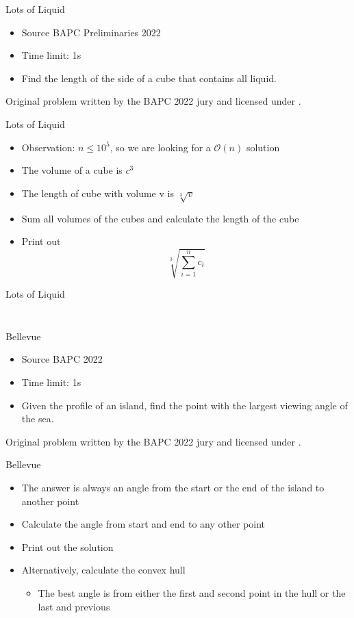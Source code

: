 \documentclass[11pt,pdf, aspectratio=169]{beamer}
\begin{document}
  \begin{frame}{Lots of Liquid}
    \begin{itemize}
      \item Source BAPC Preliminaries 2022
      \item Time limit: 1s
      \item Find the length of the side of a cube that contains all liquid.
    \end{itemize}
    Original problem written by the BAPC 2022 jury and licensed under \doclicenseLongNameRef.

    \doclicenseImage
  \end{frame}
  \begin{frame}{Lots of Liquid}
    \begin{itemize}
      \item Observation: $n \leq 10^5$, so we are looking for a $\mathcal{O}(n)$ solution
      \item The volume of a cube is $c^3$
      \item The length of cube with volume v is $\sqrt[3]{v}$
      \item Sum all volumes of the cubes and calculate the length of the cube
      \item Print out \[\sqrt[3]{\sum_{i=1}^nc_i}\]
    \end{itemize}
  \end{frame}
  \begin{frame}[containsverbatim]{Lots of Liquid}
    \inputminted{python}{code/session-1/python/dapc-l.py}
    \inputminted{kotlin}{code/session-1/kotlin/dapc-l.kt}
  \end{frame}
  \begin{frame}{Bellevue}
    \begin{itemize}
      \item Source BAPC 2022
      \item Time limit: 1s
      \item  Given the profile of an island, find the point with the largest viewing angle of the sea.
    \end{itemize}
    Original problem written by the BAPC 2022 jury and licensed under \doclicenseLongNameRef.

    \doclicenseImage
  \end{frame}
  \begin{frame}{Bellevue}
    \begin{itemize}
      \item The answer is always an angle from the start or the end of the island to another point
      \item Calculate the angle from start and end to any other point
      \item Print out the solution
      \item Alternatively, calculate the convex hull
      \begin{itemize}
        \item The best angle is from either the first and second point in the hull or the last and previous
      \end{itemize}
    \end{itemize}
  \end{frame}
\end{document}
